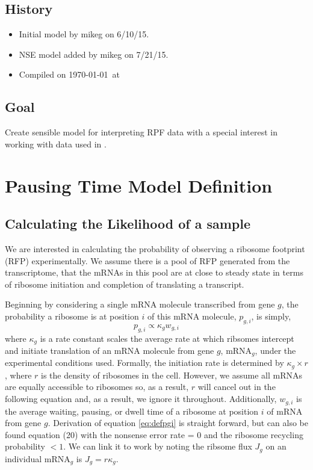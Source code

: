\documentclass{article}
\newcommand{\waitTerm}{\ensuremath{w}\xspace}
\newcommand{\wgi}{\ensuremath{\waitTerm_{g,i}}\xspace}
\newcommand{\pgi}{\ensuremath{{p_{g,i}}}\xspace}
\newcommand{\kappag}{\ensuremath{{\kappa_{g}}}\xspace}
\newcommand{\mRNAg}{mRNA$_g$\xspace}
\begin{document}
\subsection*{History}
\begin{itemize}
\item Initial model  by mikeg on 6/10/15.
\item NSE model added by mikeg on 7/21/15.
\item Compiled on \today \ at \ \currenttime
 \end{itemize}
\subsection*{Goal}
\label{goal}
Create sensible model for interpreting RPF data with a special interest in working with data used in \citet{PopEtAl14}.

\section*{Pausing Time Model Definition}
\subsection*{Calculating the Likelihood of a sample}
We are interested in calculating the probability of observing a ribosome footprint (RFP) experimentally.
We assume there is a pool of RFP generated from the transcriptome, that the mRNAs in this pool are at close to steady state in terms of ribosome initiation and completion of translating a transcript.

Beginning by considering a single mRNA molecule transcribed from gene $g$, the probability a ribosome is at position $i$ of this mRNA molecule, \pgi,  is simply,
\begin{equation} \label{eq:defpgi}
\pgi  \propto \kappag \wgi
\end{equation}
where \kappag is a rate constant scales the average rate at which ribsomes intercept and initiate translation of an mRNA molecule from gene $g$, \mRNAg, under the experimental conditions used.
Formally, the initiation rate is determined by $\kappag \times r$, where  $r$ is the density of ribosomes in the cell.
However, we assume all mRNAs are equally accessible to ribosomes so, as a result, $r$ will cancel out in the following equation and, as a result, we ignore it throughout.
Additionally, \wgi is the average waiting, pausing, or dwell time of a ribosome at position $i$ of mRNA from gene $g$.  
Derivation of equation \ref{eq:defpgi} is straight forward, but can also be found \citet{GilchristAndWagner06} equation (20) with the nonsense error rate = 0 and the ribosome recycling probability $<1$.
We can link it to \citet{PopEtAl14} work by noting the ribsome flux $J_g$ on an individual \mRNAg is $J_g = r \kappag$.
\end{document}
